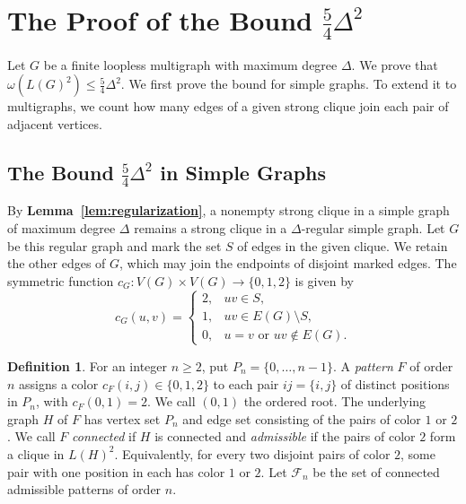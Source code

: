 \documentclass[preprint,11pt,numbers]{elsarticle-arxiv}
\numberwithin{equation}{section}
\theoremstyle{definition}
\newtheorem{defn}[theorem]{Definition}
\begin{document}
\section{The Proof of the Bound \texorpdfstring{$\frac{5}{4}\Delta^2$}{5 Delta squared / 4}}\label{sec:uniform}

Let $G$ be a finite loopless multigraph with maximum degree $\Delta$.
We prove that $\omega(L(G)^2)\leq\frac{5}{4}\Delta^2$. We first
prove the bound for simple graphs. To extend it to multigraphs, we
count how many edges of a given strong clique join each pair of
adjacent vertices.

\subsection{The Bound \texorpdfstring{$\frac{5}{4}\Delta^2$}{5 Delta squared / 4} in Simple Graphs}
\label{sec:simple-proof}\label{sec:finite-model}\label{sec:identities}\label{sec:finite-instance}
\label{subsubsec:conditional-extension-counts}

By \textbf{Lemma~\ref{lem:regularization}}, a nonempty strong clique
in a simple graph of maximum degree $\Delta$ remains a strong clique
in a $\Delta$-regular simple graph. Let $G$ be this regular graph and
mark the set $S$ of edges in the given clique. We retain the other
edges of $G$, which may join the endpoints of disjoint marked edges.
The symmetric function
$c_G\colon V(G)\times V(G)\to\{0,1,2\}$ is given by
\[
 c_G(u,v)=
 \begin{cases}
  2,&uv\in S,\\
  1,&uv\in E(G)\setminus S,\\
  0,&u=v\text{ or }uv\notin E(G).
 \end{cases}
\]

\begin{defn}\label{def:patterns}
For an integer $n\geq2$, put $P_n=\{0,\ldots,n-1\}$. A \emph{pattern}
$F$ of order $n$ assigns a color $c_F(i,j)\in\{0,1,2\}$ to each pair
$ij=\{i,j\}$ of distinct positions in $P_n$, with $c_F(0,1)=2$. We
call $(0,1)$ the ordered root. The underlying graph $H$ of $F$ has
vertex set $P_n$ and edge set consisting of the pairs of color $1$
or $2$. We call $F$ \emph{connected} if $H$ is connected and
\emph{admissible} if the pairs of color $2$ form a clique in $L(H)^2$.
Equivalently, for every two disjoint pairs of color $2$, some pair
with one position in each has color $1$ or $2$.
Let $\mathcal F_n$ be the set of connected admissible patterns of order $n$.
\end{defn}
\end{document}
